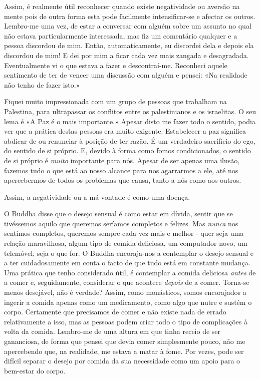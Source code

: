 Assim, é realmente útil reconhecer quando existe negatividade ou aversão
na mente pois de outra forma esta pode facilmente intensificar-se e
afectar os outros. Lembro-me uma vez, de estar a conversar com alguém
sobre um assunto no qual não estava particularmente interessada, mas fiz
um comentário qualquer e a pessoa discordou de mim. Então,
automaticamente, eu discordei dela e depois ela discordou de mim! E dei
por mim a ficar cada vez mais zangada e desagradada. Eventualmente vi o
que estava a fazer e descontraí-me. Reconheci aquele sentimento de ter
de vencer uma discussão com alguém e pensei: «Na realidade não tenho de
fazer isto.»

Fiquei muito impressionada com um grupo de pessoas que trabalham na
Palestina, para ultrapassar os conflitos entre os palestinianos e os
israelitas. O seu lema é «A Paz é o mais importante.» Apesar disto me
fazer todo o sentido, podia ver que a prática destas pessoas era muito
exigente. Estabelecer a paz significa abdicar de ou renunciar à posição
de ter razão. É um verdadeiro sacrifício do ego, do sentido de si
próprio. E, devido à forma como fomos condicionados, o sentido de si
próprio é \emph{muito} importante para nós. Apesar de ser apenas uma
ilusão, fazemos tudo o que está ao nosso alcance para nos agarrarmos a
ele, até nos apercebermos de todos os problemas que causa, tanto a nós
como aos outros.

Assim, a negatividade ou a má vontade é como uma doença.

O Buddha disse que o desejo sensual é como estar em dívida, sentir que
se tivéssemos aquilo que queremos seríamos completos e felizes. Mas
\emph{nunca} nos sentimos completos, queremos sempre cada vez mais e
melhor - quer seja uma relação maravilhosa, algum tipo de comida
deliciosa, um computador novo, um telemóvel, seja o que for. O Buddha
encoraja-nos a contemplar o desejo sensual e a ter cuidadosamente em
conta o facto de que tudo está em constante mudança. Uma prática que
tenho considerado útil, é contemplar a comida deliciosa \emph{antes} de
a comer e, seguidamente, considerar o que acontece \emph{depois} de a
comer. Torna-se menos desejável, não é verdade? Assim, como monásticos,
somos encorajados a ingerir a comida apenas como um medicamento, como
algo que nutre e sustém o corpo. Certamente que precisamos de comer e
não existe nada de errado relativamente a isso, mas as pessoas podem
criar todo o tipo de complicações à volta da comida. Lembro-me de uma
altura em que tinha receio de ser gananciosa, de forma que pensei que
devia comer simplesmente pouco, não me apercebendo que, na realidade, me
estava a matar à fome. Por vezes, pode ser difícil separar o desejo por
comida da sua necessidade como um apoio para o bem-estar do corpo.


